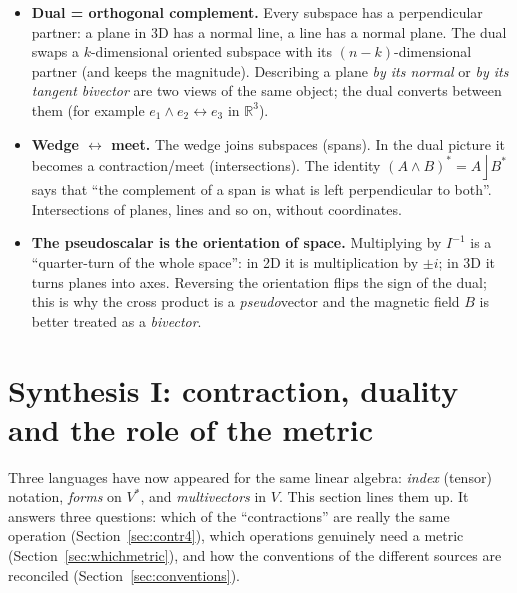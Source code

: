 \documentclass[11pt,a4paper]{article}
\numberwithin{equation}{section}
\theoremstyle{definition}
\theoremstyle{plain}
\newcommand{\R}{\mathbb{R}}
\newcommand{\lc}{\mathbin{\rfloor}}
\newcommand{\pss}{I}
\newcommand{\dual}[1]{#1^{\ast}}
\begin{document}
\begin{intuition}
\begin{itemize}
  \item \textbf{Dual = orthogonal complement.} Every subspace has a perpendicular partner: a plane in $3$D has a normal line, a line has a normal plane. The dual swaps a $k$-dimensional oriented subspace with its $(n-k)$-dimensional partner (and keeps the magnitude).
  Describing a plane \emph{by its normal} or \emph{by its tangent bivector} are two views of the same object; the dual converts between them (for example $e_1\wedge e_2\leftrightarrow e_3$ in $\R^3$).
  \item \textbf{Wedge $\leftrightarrow$ meet.} The wedge joins subspaces (spans). In the dual picture it becomes a contraction/meet (intersections). The identity $\dual{(A\wedge B)}=A\lc\dual B$ says that ``the complement of a span is what is left perpendicular to both''. Intersections of planes, lines and so on, without coordinates.
  \item \textbf{The pseudoscalar is the orientation of space.} Multiplying by $\pss^{-1}$ is a ``quarter-turn of the whole space'': in 2D it is multiplication by $\pm i$; in 3D it turns planes into axes. Reversing the orientation flips the sign of the dual; this is why the cross product is a \emph{pseudo}vector and the magnetic field $B$ is better treated as a \emph{bivector}.
\end{itemize}
\end{intuition}



\section{Synthesis I: contraction, duality and the role of the metric}\label{sec:synth1}

\begin{synthesis}
Three languages have now appeared for the same linear algebra: \emph{index} (tensor) notation, \emph{forms} on $V^*$, and \emph{multivectors} in $V$. This
section lines them up. It answers three questions: which of the ``contractions'' are really the same operation
(Section~\ref{sec:contr4}), which operations genuinely need a metric (Section~\ref{sec:whichmetric}), and how the
conventions of the different sources are reconciled (Section~\ref{sec:conventions}).
\end{synthesis}
\end{document}
